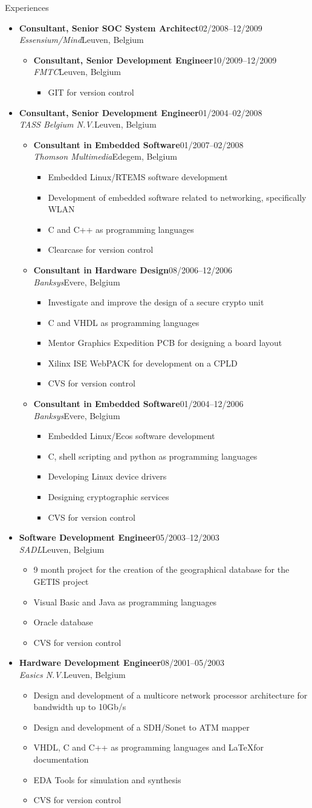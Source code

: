 \documentclass[12pt,oneside]{article}
\newenvironment{ressection}[1]{
	\vspace{5pt}
	{\selectfont\Large#1}
	\begin{itemize}
	\vspace{5pt}
}{
	\end{itemize}
}
\newcommand{\ressubitem}[1]{
	\vspace{-4pt}
	\item \begin{flushleft} #1 \end{flushleft}
}
\newcommand{\resbigitem}[4]{
	\vspace{-5pt}
	\item
	\textbf{#1}\hfill#4 \\
	\textit{#2}\hfill#3
}
\newenvironment{ressubsec}[4]{
	\resbigitem{#1}{#2}{#3}{#4}
	\vspace{-2pt}
	\begin{itemize}
}{
	\end{itemize}
}
\newenvironment{ressubsubsec}[4]{
	\vspace{5pt}
	\resbigitem{#1}{#2}{#3}{#4}
	\begin{itemize}
}{
	\end{itemize}
}
\newcommand{\ressubsubitem}[1]{
	\vspace{-1pt}
	\item \begin{flushleft} #1 \end{flushleft}
}
\begin{document}
\begin{ressection}{Experiences}
\begin{ressubsec}{Consultant, Senior SOC System Architect}{Essensium/Mind}{Leuven, Belgium}{02/2008--12/2009}
\begin{ressubsubsec}{Consultant, Senior Development Engineer}{FMTC}{Leuven, Belgium}{10/2009--12/2009}
			\ressubsubitem{GIT for version control}
		\end{ressubsubsec}
	\end{ressubsec}
	\begin{ressubsec}{Consultant, Senior Development Engineer}{TASS Belgium N.V.}{Leuven, Belgium}{01/2004--02/2008}
		\begin{ressubsubsec}{Consultant in Embedded Software}{Thomson Multimedia}{Edegem, Belgium}{01/2007--02/2008}
			\ressubsubitem{Embedded Linux/RTEMS software development}
			\ressubsubitem{Development of embedded software related to networking, specifically WLAN}
			\ressubsubitem{C and C++ as programming languages}
			\ressubsubitem{Clearcase for version control}
		\end{ressubsubsec}
		\begin{ressubsubsec}{Consultant in Hardware Design}{Banksys}{Evere, Belgium}{08/2006--12/2006}
			\ressubsubitem{Investigate and improve the design of a secure crypto unit}
			\ressubsubitem{C and VHDL as programming languages}
			\ressubsubitem{Mentor Graphics Expedition PCB for designing a board layout}
			\ressubsubitem{Xilinx ISE WebPACK for development on a CPLD}
			\ressubsubitem{CVS for version control}
		\end{ressubsubsec}
		\begin{ressubsubsec}{Consultant in Embedded Software}{Banksys}{Evere, Belgium}{01/2004--12/2006}
			\ressubsubitem{Embedded Linux/Ecos software development}
			\ressubsubitem{C, shell scripting and python as programming languages}
			\ressubsubitem{Developing Linux device drivers}
			\ressubsubitem{Designing cryptographic services}
			\ressubsubitem{CVS for version control}
		\end{ressubsubsec}
	\end{ressubsec}
	\begin{ressubsec}{Software Development Engineer}{SADL}{Leuven, Belgium}{05/2003--12/2003}
		\ressubitem{9 month project for the creation of the geographical database for the GETIS project}
		\ressubitem{Visual Basic and Java as programming languages}
		\ressubitem{Oracle database}
		\ressubitem{CVS for version control}
	\end{ressubsec}
	\begin{ressubsec}{Hardware Development Engineer}{Easics N.V.}{Leuven, Belgium}{08/2001--05/2003}
		\ressubitem{Design and development of a multicore network processor architecture for bandwidth up to 10Gb/s}
		\ressubitem{Design and development of a SDH/Sonet to ATM mapper}
		\ressubitem{VHDL, C and C++ as programming languages and \LaTeX for documentation}
		\ressubitem{EDA Tools for simulation and synthesis}
		\ressubitem{CVS for version control}
	\end{ressubsec}
\end{ressection}
\end{document}
